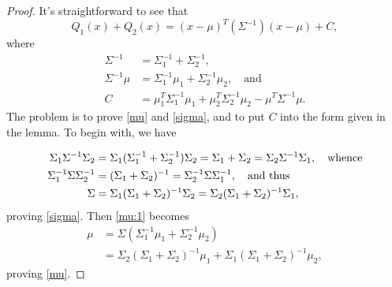 \documentclass[12pt,leqno]{article}
\begin{document}
\begin{proof}

It's straightforward to see that
$$
Q_1(x) + Q_2(x) = (x-\mu)^T(\Sigma^{-1})(x-\mu) + C,
$$
where
\begin{align}
 \Sigma^{-1} &= \Sigma_1^{-1} + \Sigma_2^{-1},\label{Sigma}\\
  \Sigma^{-1}\mu &=\Sigma_1^{-1}\mu_1+\Sigma_2^{-1}\mu_2, \quad\text{and}\label{mu:1}\\
  C &= \mu_1^T\Sigma_1^{-1}\mu_1 +\mu_2^T\Sigma_2^{-1}\mu_2 - \mu^T\Sigma^{-1}\mu.
  \label{C}
\end{align}
The problem is to prove \eqref{mu} and \eqref{sigma}, and to put $C$ into the form given in the lemma.
 To begin with, we have

\begin{align}
  \Sigma_1\Sigma^{-1}\Sigma_2 &= \Sigma_1(\Sigma_1^{-1}+\Sigma_2^{-1})\Sigma_2 = \Sigma_1+\Sigma_2
  = \Sigma_2\Sigma^{-1}\Sigma_1,\quad\text{whence}\notag\\
  \Sigma_1^{-1}\Sigma\Sigma_2^{-1} &= (\Sigma_1+\Sigma_2)^{-1} = \Sigma_2^{-1}\Sigma\Sigma_1^{-1},\quad\text{and thus}\notag\\
  \Sigma &= \Sigma_1(\Sigma_1 + \Sigma_2)^{-1}\Sigma_2 = \Sigma_2(\Sigma_1+\Sigma_2)^{-1}\Sigma_1,\label{Sigma:1}
\end{align}
proving \eqref{sigma}.  Then \eqref{mu:1} becomes
\begin{equation}\label{mu:2}
  \begin{split}
    \mu &=  \Sigma(\Sigma_1^{-1}\mu_1+\Sigma_2^{-1}\mu_2)\\
    &=\Sigma_2(\Sigma_1+\Sigma_2)^{-1}\mu_1+\Sigma_1(\Sigma_1+\Sigma_2)^{-1}\mu_2,
  \end{split}
\end{equation}
proving \eqref{mu}.


\end{proof}
\end{document}
